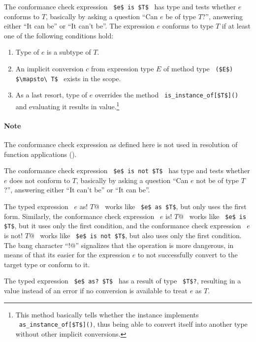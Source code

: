 The conformance check expression ~\lstinline!$e$ is $T$!~ has type  and tests whether $e$ conforms to $T$, basically by asking a question ``Can $e$ be of type $T$?'', answering either ``It can be'' or ``It can't be''. The expression $e$ conforms to type $T$ if at least one of the following conditions hold:
\begin{enumerate}
  \item Type of $e$ is a subtype of $T$. 
  \item An implicit conversion $c$ from expression type $E$ of method type ~\lstinline!($E$) $\mapsto\ T$!~ exists in the scope. 
  \item As a last resort, type of $e$ overrides the method ~\lstinline!is_instance_of[$T$]()!~ and evaluating it results in  value.\footnote{This method basically tells whether the instance implements ~\lstinline!as_instance_of[$T$]()!, thus being able to convert itself into another type without other implicit conversions.}
\end{enumerate}

\paragraph{Note} 
The conformance check expression as defined here is not used in resolution of function applications ().

The conformance check expression ~\lstinline!$e$ is not $T$!~ has type  and tests whether $e$ does not conform to $T$, basically by asking a question ``Can $e$ not be of type $T$?'', answering either ``It can't be'' or ``It can be''.

The typed expression ~\lstinline@$e$ as! $T$@~ works like ~\lstinline!$e$ as $T$!, but only uses the first form. Similarly, the conformance check expression ~\lstinline@$e$ is! $T$@~ works like ~\lstinline!$e$ is $T$!, but it uses only the first condition, and the conformance check expression ~\lstinline@$e$ is not! $T$@~ works like ~\lstinline!$e$ is not $T$!, but also uses only the first condition. The bang character ``\lstinline@!@'' signalizes that the operation is more dangerous, in means of that its easier for the expression $e$ to not successfully convert to the target type or conform to it. 

The typed expression ~\lstinline!$e$ as? $T$!~ has a result of type ~\lstinline!$T$?!, resulting in a  value instead of an error if no conversion is available to treat $e$ as $T$. 

